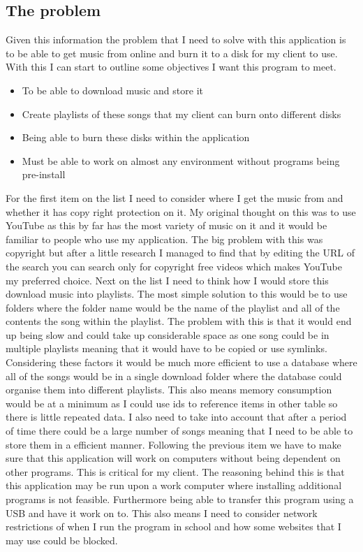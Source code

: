 \documentclass{article}
\def\tightlist{}
\begin{document}
\subsection{The problem}\label{the-problem}
Given this information the problem that I need to solve with this
application is to be able to get music from online and burn it to a disk
for my client to use. With this I can start to outline some objectives I
want this program to meet.
\begin{itemize}
        \tightlist
    \item
        To be able to download music and store it
    \item
        Create playlists of these songs that my client can burn onto different
        disks
    \item
        Being able to burn these disks within the application
    \item
        Must be able to work on almost any environment without programs being
        pre-install
\end{itemize}
For the first item on the list I need to consider where I get the music
from and whether it has copy right protection on it. My original thought
on this was to use YouTube as this by far has the most variety of music
on it and it would be familiar to people who use my application. The big
problem with this was copyright but after a little research I managed to
find that by editing the URL of the search you can search only for
copyright free videos which makes YouTube my preferred choice.
Next on the list I need to think how I would store this download music
into playlists. The most simple solution to this would be to use folders
where the folder name would be the name of the playlist and all of the
contents the song within the playlist. The problem with this is that it
would end up being slow and could take up considerable space as one song
could be in multiple playlists meaning that it would have to be copied
or use symlinks. Considering these factors it would be much more
efficient to use a database where all of the songs would be in a single
download folder where the database could organise them into different
playlists. This also means memory consumption would be at a minimum as I
could use ids to reference items in other table so there is little
repeated data. I also need to take into account that after a period of time
there could be a large number of songs meaning that I need to be able to store
them in a efficient manner.
Following the previous item we have to make sure that this application
will work on computers without being dependent on other programs. This
is critical for my client. The reasoning behind this is that this
application may be run upon a work computer where installing additional
programs is not feasible. Furthermore being able to transfer this
program using a USB and have it work on to. This also means I need to consider
network restrictions of when I run the program in school and how some websites
that I may use could be blocked.
\end{document}
